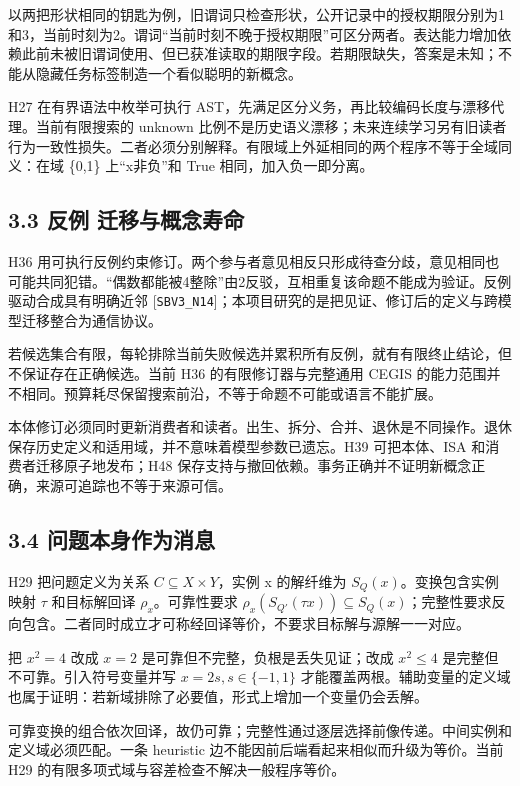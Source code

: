 \documentclass[
  10pt,
]{article}
\begin{document}
以两把形状相同的钥匙为例，旧谓词只检查形状，公开记录中的授权期限分别为1和3，当前时刻为2。谓词``当前时刻不晚于授权期限''可区分两者。表达能力增加依赖此前未被旧谓词使用、但已获准读取的期限字段。若期限缺失，答案是未知；不能从隐藏任务标签制造一个看似聪明的新概念。

H27 在有界语法中枚举可执行
AST，先满足区分义务，再比较编码长度与漂移代理。当前有限搜索的 unknown
比例不是历史语义漂移；未来连续学习另有旧读者行为一致性损失。二者必须分别解释。有限域上外延相同的两个程序不等于全域同义：在域
\{0,1\} 上``x非负''和 True 相同，加入负一即分离。

\subsection{3.3 反例
迁移与概念寿命}\label{ux53cdux4f8b-ux8fc1ux79fbux4e0eux6982ux5ff5ux5bffux547d}

H36
用可执行反例约束修订。两个参与者意见相反只形成待查分歧，意见相同也可能共同犯错。``偶数都能被4整除''由2反驳，互相重复该命题不能成为验证。反例驱动合成具有明确近邻
{[}\nolinkurl{SBV3_N14}{]}；本项目研究的是把见证、修订后的定义与跨模型迁移整合为通信协议。

若候选集合有限，每轮排除当前失败候选并累积所有反例，就有有限终止结论，但不保证存在正确候选。当前
H36 的有限修订器与完整通用 CEGIS
的能力范围并不相同。预算耗尽保留搜索前沿，不等于命题不可能或语言不能扩展。

本体修订必须同时更新消费者和读者。出生、拆分、合并、退休是不同操作。退休保存历史定义和适用域，并不意味着模型参数已遗忘。H39
可把本体、ISA 和消费者迁移原子地发布；H48
保存支持与撤回依赖。事务正确并不证明新概念正确，来源可追踪也不等于来源可信。

\subsection{3.4
问题本身作为消息}\label{ux95eeux9898ux672cux8eabux4f5cux4e3aux6d88ux606f}

H29 把问题定义为关系 \(C\subseteq X\times Y\)，实例 x 的解纤维为
\(S_Q(x)\)。变换包含实例映射 \(\tau\) 和目标解回译
\(\rho_x\)。可靠性要求
\(\rho_x(S_{Q'}(\tau x))\subseteq S_Q(x)\)；完整性要求反向包含。二者同时成立才可称经回译等价，不要求目标解与源解一一对应。

把 \(x^2=4\) 改成 \(x=2\) 是可靠但不完整，负根是丢失见证；改成
\(x^2\le4\) 是完整但不可靠。引入符号变量并写 \(x=2s,s\in\{-1,1\}\)
才能覆盖两根。辅助变量的定义域也属于证明：若新域排除了必要值，形式上增加一个变量仍会丢解。

可靠变换的组合依次回译，故仍可靠；完整性通过逐层选择前像传递。中间实例和定义域必须匹配。一条
heuristic 边不能因前后端看起来相似而升级为等价。当前 H29
的有限多项式域与容差检查不解决一般程序等价。
\end{document}
